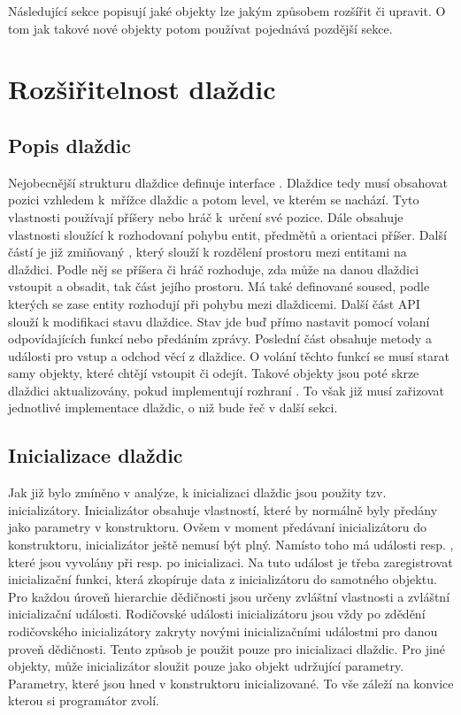 Následující sekce popisují jaké objekty lze jakým způsobem rozšířit či upravit. O tom jak takové nové objekty potom používat
pojednává pozdější sekce.

\section{Rozšiřitelnost dlaždic}
\subsection{Popis dlaždic}
Nejobecnější strukturu dlaždice definuje interface . Dlaždice tedy musí obsahovat pozici vzhledem
k~mřížce dlaždic a potom level, ve kterém se nachází. Tyto vlastnosti používají příšery nebo hráč k~určení
své pozice. Dále obsahuje vlastnosti sloužící k rozhodovaní pohybu entit, předmětů a orientaci příšer. Další částí
je již zmiňovaný , který slouží k rozdělení prostoru mezi entitami na dlaždici. Podle něj se 
příšera či hráč rozhoduje, zda může na danou dlaždici vstoupit a obsadit, tak část jejího prostoru. Má také definované
soused, podle kterých se zase entity rozhodují při pohybu mezi dlaždicemi. Další část API slouží k modifikaci stavu dlaždice.
Stav jde buď přímo nastavit pomocí volaní odpovídajících funkcí nebo předáním zprávy. Poslední
část obsahuje metody a události pro vstup a odchod věcí z dlaždice. O volání těchto  funkcí se musí starat samy objekty,
které chtějí vstoupit či odejít. Takové objekty jsou poté skrze dlaždici aktualizovány, pokud implementují rozhraní
. To však již musí zařizovat jednotlivé implementace dlaždic, o niž bude řeč v další sekci.

\subsection{Inicializace dlaždic}
Jak již bylo zmíněno v analýze, k inicializaci dlaždic jsou použity tzv. inicializátory. Inicializátor
obsahuje vlastností, které by normálně byly předány jako parametry v konstruktoru. Ovšem v moment předávaní
inicializátoru do konstruktoru, inicializátor ještě nemusí být plný. Namísto toho má události 
resp. , které jsou vyvolány při resp. po inicializaci. Na tuto událost je třeba zaregistrovat
inicializační funkci, která zkopíruje data z inicializátoru do samotného objektu. Pro každou úroveň hierarchie
dědičnosti jsou určeny zvláštní vlastnosti a zvláštní inicializační události. Rodičovské události  inicializátoru jsou vždy
po zdědění rodičovského inicializátory zakryty novými inicializačními událostmi pro danou proveň dědičnosti.
Tento způsob je použit pouze pro inicializaci dlaždic. Pro jiné objekty, může inicializátor sloužit pouze jako 
objekt udržující parametry. Parametry, které jsou hned v konstruktoru inicializované. To vše záleží na konvice kterou si
programátor zvolí.

